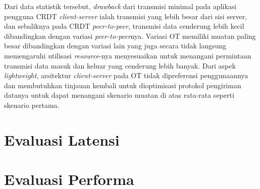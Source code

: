 Dari data statistik tersebut, \textit{drawback} dari transmisi minimal pada aplikasi pengguna CRDT \textit{client-server} ialah transmisi yang lebih besar dari sisi server, dan sebaliknya pada CRDT \textit{peer-to-peer}, transmisi data cenderung lebih kecil dibandingkan dengan variasi \textit{peer-to-peer}nya. Variasi OT memiliki muatan paling besar dibandingkan dengan variasi lain yang juga secara tidak langsung memengaruhi utilisasi \textit{resource}-nya menyesuaikan untuk menangani permintaan transmisi data masuk dan keluar yang cenderung lebih banyak. Dari aspek \textit{lightweight}, arsitektur \textit{client-server} pada OT tidak dipreferensi penggunaannya dan membutuhkan tinjauan kembali untuk dioptimisasi protokol pengiriman datanya untuk dapat menangani skenario muatan di atas rata-rata seperti skenario pertama.

\section{Evaluasi Latensi}





\section{Evaluasi Performa}